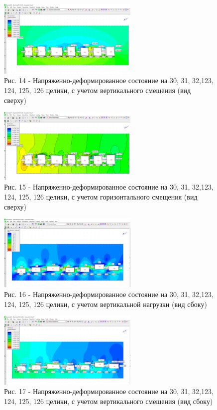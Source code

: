 \begin{figure}[H]
	\centering
	\includegraphics[width=0.6\textwidth]{media/gor/image17}
	\caption*{Рис. 14 - Напряженно-деформированное состояние на 30, 31,
	32,123, 124, 125, 126 целики, с учетом вертикального смещения (вид сверху)}
\end{figure}

\begin{figure}[H]
	\centering
	\includegraphics[width=0.6\textwidth]{media/gor/image18}
	\caption*{Рис. 15 - Напряженно-деформированное состояние на 30, 31,
	32,123, 124, 125, 126 целики, с учетом горизонтального смещения (вид сверху)}
\end{figure}

\begin{figure}[H]
	\centering
	\includegraphics[width=0.6\textwidth]{media/gor/image19}
	\caption*{Рис. 16 - Напряженно-деформированное состояние на 30, 31,
	32,123, 124, 125, 126 целики, с учетом вертикальной нагрузки (вид сбоку)}
\end{figure}

\begin{figure}[H]
	\centering
	\includegraphics[width=0.6\textwidth]{media/gor/image20}
	\caption*{Рис. 17 - Напряженно-деформированное состояние на 30, 31,
	32,123, 124, 125, 126 целики, с учетом вертикального смещения (вид сбоку)}
\end{figure}

